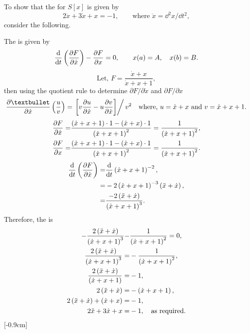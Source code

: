 To show that the \el for $S[x]$ is given by
\[
	2\ddot{x} + 3\dot{x} + x = -1,\qquad\textrm{where } \ddot{x} = \dd^2x/\dd t^2,
\]
consider the following.

The \el is given by%
\[
	\ELEd{F}{t}{x},\qquad x(a)=A,\quad x(b)=B.
\]
\[
	\textrm{Let, } F = \frac{\dot{x} + x}{\dot{x} + x + 1},
\]
then using the quotient rule to determine $\partial F/\partial\dot{x}$ and $\partial F/\partial x$
\begin{align*}
		\pderiv{•}{\dot{x}}\lr{\frac{u}{v}} = \left.\lrs{v\pderiv{u}{\dot{x}} - u\pderiv{v}{\dot{x}}}\right/v^2\quad\textrm{where, }u=\dot{x} + x\textrm{ and } v=\dot{x} + x + 1.
\end{align*}
\begin{align*}
	\pderiv{F}{\dot{x}} =& \frac{\lr{\dot{x} + x + 1}\cdot 1 - \lr{\dot{x} + x}\cdot 1}{\lr{\dot{x} + x + 1}^2} = \frac{1}{\lr{\dot{x} + x + 1}^2},\\
	\pderiv{F}{x} =& \frac{\lr{\dot{x} + x + 1}\cdot 1 - \lr{\dot{x} + x}\cdot 1}{\lr{\dot{x} + x + 1}^2} = \frac{1}{\lr{\dot{x} + x + 1}^2}.
\end{align*}
\begin{align*}
	\deriv{}{t}\lr{\pderiv{F}{\dot{x}}} =& \deriv{}{t}\lr{\dot{x} + x + 1}^{-2},\\
	=& -2\lr{\dot{x} + x + 1}^{-3}\lr{\ddot{x}+\dot{x}},\\
	=& \frac{-2\lr{\ddot{x}+\dot{x}}}{\lr{\dot{x} + x + 1}^{3}}.
\end{align*}
Therefore, the \el is
\begin{align}
	-\frac{2\lr{\ddot{x}+\dot{x}}}{\lr{\dot{x} + x + 1}^{3}} -& \frac{1}{\lr{\dot{x} + x + 1}^{2}} = 0,\nonumber\\
	\frac{2\lr{\ddot{x}+\dot{x}}}{\lr{\dot{x} + x + 1}^{3}} =& -\frac{1}{\lr{\dot{x} + x + 1}^{2}},\nonumber\\
	\frac{2\lr{\ddot{x}+\dot{x}}}{\lr{\dot{x} + x + 1}} =& -1,\nonumber\\
	2\lr{\ddot{x}+\dot{x}} =& -\lr{\dot{x} + x + 1},\nonumber\\
	2\lr{\ddot{x}+\dot{x}} + \lr{\dot{x} + x} =& -1,\nonumber\\
	\label{eq:6.2}
	2\ddot{x} + 3\dot{x} + x =&-1,\quad\textrm{as required.}
\end{align}
[-0.9cm]%
